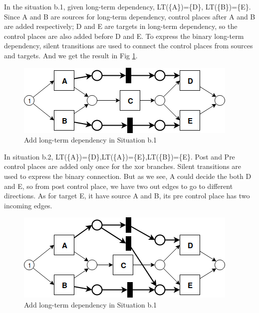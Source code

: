 \documentclass[]{article}
\begin{document}
In the situation b.1, given long-term dependency, LT(\{A\})=\{D\}, LT(\{B\})=\{E\}. Since A and B are sources for long-term dependency, control places after A and B are added respectively; D and E are targets in long-term dependency, so the control places are also added before D and E. To express the binary long-term dependency, silent transitions are used to connect the control places from sources and targets. And we get the result in Fig \ref{fig:lt_seq_case_01}.
\begin{figure}[!h]
	\includegraphics[width=\textwidth]{LT_Seq_01_Case_01.png}
	\caption{Add long-term dependency in Situation b.1}
	\label{fig:lt_seq_case_01}
\end{figure}

In situation b.2, LT(\{A\})=\{D\},LT(\{A\})=\{E\},LT(\{B\})=\{E\}. Post and Pre control places are added only once for the xor branches. Silent transitions are used to express the binary connection. But as we see, A could decide the both D and E, so from post control place, we have two out edges to go to different directions. As for target E, it have source A and B, its pre control place has two incoming edges. 
\begin{figure}[!h]
	\includegraphics[width=\textwidth]{LT_Seq_01_Case_02.png}
	\caption{Add long-term dependency in Situation b.1}
	\label{fig:lt_seq_case_02}
\end{figure}
\end{document}
